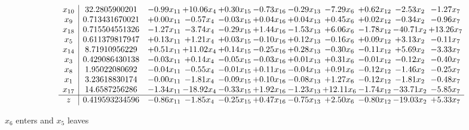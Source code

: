 \documentclass[9pt]{article}
\begin{document}
 \[\begin{array}{c| c c@{\hskip 2pt} c@{\hskip 2pt} c@{\hskip 2pt} c@{\hskip 2pt} c@{\hskip 2pt} c@{\hskip 2pt} c@{\hskip 2pt} c@{\hskip 2pt} c@{\hskip 2pt} }
 x_{10}   &  32.2805900201 & -0.99 x_{11} & + 10.06 x_{4} & +  0.30 x_{15} & -0.73 x_{16} & -0.29 x_{13} & -7.29 x_{6} & +  0.62 x_{12} & -2.53 x_{2} & -1.27 x_{7}\\
 x_{9}   &  0.713431670021 & +  0.00 x_{11} & -0.57 x_{4} & -0.03 x_{15} & +  0.04 x_{16} & +  0.04 x_{13} & +  0.45 x_{6} & +  0.02 x_{12} & -0.34 x_{2} & -0.96 x_{7}\\
 x_{18}   &  0.715504551326 & -1.27 x_{11} & -3.74 x_{4} & -0.29 x_{15} & +  1.44 x_{16} & -1.53 x_{13} & +  6.06 x_{6} & -1.78 x_{12} & -40.71 x_{2} & + 13.26 x_{7}\\
 x_{5}   &  0.611379817947 & +  0.13 x_{11} & +  1.21 x_{4} & +  0.03 x_{15} & -0.10 x_{16} & +  0.12 x_{13} & -0.16 x_{6} & +  0.09 x_{12} & +  3.13 x_{2} & -0.11 x_{7}\\
 x_{14}   &  8.71910956229 & +  0.51 x_{11} & + 11.02 x_{4} & +  0.14 x_{15} & -0.25 x_{16} & +  0.28 x_{13} & -0.30 x_{6} & -0.11 x_{12} & +  5.69 x_{2} & -3.33 x_{7}\\
 x_{3}   &  0.429086430138 & -0.03 x_{11} & +  0.14 x_{4} & -0.05 x_{15} & -0.03 x_{16} & +  0.01 x_{13} & +  0.31 x_{6} & -0.01 x_{12} & -0.12 x_{2} & -0.40 x_{7}\\
 x_{8}   &  1.95022080692 & -0.04 x_{11} & -0.55 x_{4} & -0.01 x_{15} & +  0.11 x_{16} & -0.04 x_{13} & +  0.91 x_{6} & -0.12 x_{12} & -1.46 x_{2} & -0.25 x_{7}\\
 x_{1}   &  3.23618830174 & -0.00 x_{11} & -1.81 x_{4} & -0.09 x_{15} & +  0.10 x_{16} & -0.08 x_{13} & +  1.27 x_{6} & -0.12 x_{12} & -1.81 x_{2} & -0.48 x_{7}\\
 x_{17}   &  14.6587256286 & -1.34 x_{11} & -18.92 x_{4} & -0.33 x_{15} & +  1.92 x_{16} & -1.23 x_{13} & + 12.11 x_{6} & -1.74 x_{12} & -33.71 x_{2} & -5.85 x_{7}\\
\hline
z    &  0.419593234596 & -0.86 x_{11} & -1.85 x_{4} & -0.25 x_{15} & +  0.47 x_{16} & -0.75 x_{13} & +  2.50 x_{6} & -0.80 x_{12} & -19.03 x_{2} & +  5.33 x_{7}\\
\end{array}\]


 $ x_{6} $ enters and $ x_{5} $ leaves 
\end{document}
